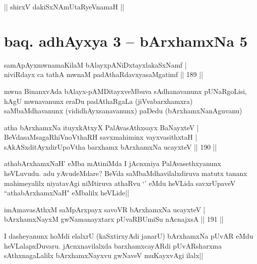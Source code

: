 \begin{center}
|| shirxV dakiSxNAmUtaRyeVnamaH ||
\end{center}

\section*{baq. adhAyxya 3 -- bArxhamxNa 5}

\begin{shl}
samApAyxmwnamaKilaM bAlayxpANiDxtayxlakaSxNamf |\\
niviRdayx ca tathA mwnaM padAthaRdavxyasaMgatimf \hfill || 189 ||
\end{shl}

\begin{artha}%
mwna BinanxvAda bAlayx-pAMDitayxveMbuva sAdhanavanunx pUNaRgoLisi, hAgU mwnavanunx eraDu padAthaRgaLa (jiVvabarxhamxra) saMbaMdhavanunx (vididhAyxsanavanunx) paDedu (bArxhamxNanAguvanu)
\end{artha}


\begin{shl}
atha bArxhamxNa ituyxkAtxyX PalAvasAthx\s sayx BaNayxteV |\\
BeVdasaMsagaRhiVnoV\s thaRH savxmahiminx vayxvasithxtaH |\\
sAkASxditAyxdirUpoV\s tha barxhamx bArxhamxNa ucayxteV \hfill || 190 ||
\end{shl}

\begin{artha}
athabArxhamxNaH' eMba mAtiniMda I jAcnxniya PalAvasethxyanunx heVLuvudu. adu yAvudeMdare? BeVda saMbaMdhavilalxdiruva matutx tananx mahimeyalilx niyatavAgi niMtiruva athaRvu `\stext ' eMdu heVLida savxrUpaveV ``athabArxhamxNaH" eMbalilx heVLide||
\end{artha}


\begin{shl}
imAmavasAthxM saMpArxpayx savoVR bArxhamxNa ucayxteV |\\
bArxhamxNayxM gwNamanayxtarx pUvaRBUmiSu nAcnajxsA \hfill || 191 ||
\end{shl}

\begin{artha}
I dasheyanunx hoMdi elalxrU (kaSxtirxyAdi janarU) bArxhamxNa pUvAR eMdu heVLalapxDuvaru. jAcnxnavilalxda barxhamxcayARdi pUvARsharxma sAthxnagaLalilx bArxhamxNayxvu gwNaveV muKayxvAgi ilalx||
\end{artha}

